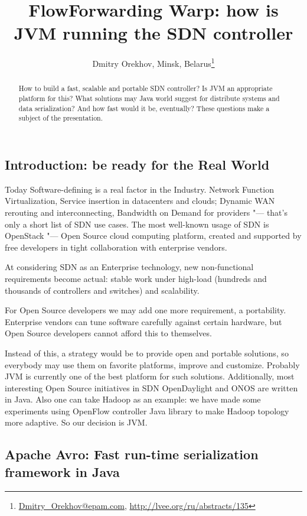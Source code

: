 \documentclass[10pt, a5paper]{article}
\begin{document}
\title{FlowForwarding Warp: how is JVM running the SDN controller}
\author{Dmitry Orekhov, Minsk, Belarus\footnote{\url{Dmitry_Orekhov@epam.com}, \url{http://lvee.org/ru/abstracts/135}}}
\maketitle
\begin{abstract}
How to build a fast, scalable and portable SDN controller? Is JVM an appropriate platform for this? What solutions may Java world suggest for distribute systems and data serialization? And how fast would it be, eventually?
These questions make a subject of the presentation.
\end{abstract}
\subsection*{Introduction: be ready for the Real World}

Today Software-defining is a real factor in the Industry. Network Function Virtualization, Service insertion in datacenters and clouds; Dynamic WAN rerouting and interconnecting, Bandwidth on Demand for providers "--- that's only a short list of SDN use cases. The most well-known usage of SDN is OpenStack "--- Open Source cloud computing platform, created and supported by free developers in tight collabora\-tion with enterprise vendors.

At considering SDN as an Enterprise technology, new non-functional requirements become actual: stable work under high-load (hundreds and thousands of controllers and switches) and scalability.

For Open Source developers we may add one more requirement, a portability. Enterprise vendors can tune software carefully against certain hardware, but Open Source developers cannot afford this to themselves.

Instead of this, a strategy would be to provide open and portable solutions, so everybody may use them on favorite platforms, improve and customize. Probably JVM is currently one of the best platform for such solutions. 
Additionally, most interesting Open Source initiatives in SDN OpenDaylight and ONOS are written in Java. Also one can take Hadoop as an example: we have made some experiments using OpenFlow controller Java library to make Hadoop topology more adap\-tive. 
So our decision is JVM.

\subsection*{Apache Avro: Fast run-time serialization framework in Java}
\end{document}
